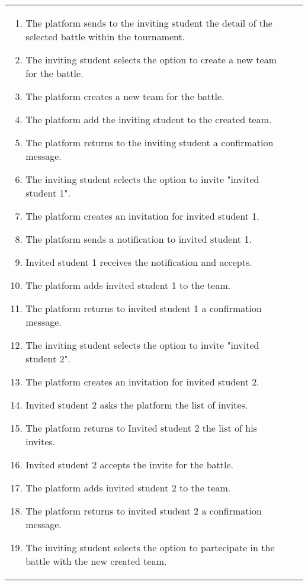 \begin{enumerate}[label=\textbf{UC\arabic*}:,ref=UC\arabic*,leftmargin=1.3cm]
{\begin{table}[H]
\begin{tabular}{|l|p{11.9cm}|}
\begin{enumerate}[label=\arabic*.]
                              \item The platform sends to the inviting student the detail of the selected battle within the tournament.
                              \item The inviting student selects the option to create a new team for the battle.
                              \item The platform creates a new team for the battle.
                              \item The platform add the inviting student to the created team.
                              \item The platform returns to the inviting student a confirmation message.
                              \item The inviting student selects the option to invite "invited student 1".
                              \item The platform creates an invitation for invited student 1.
                              \item The platform sends a notification to invited student 1.
                              \item Invited student 1 receives the notification and accepts.
                              \item The platform adds invited student 1 to the team.
                              \item The platform returns to invited student 1 a confirmation message.
                              \item The inviting student selects the option to invite "invited student 2".
                              \item The platform creates an invitation for invited student 2.
                              \item Invited student 2 asks the platform the list of invites.
                              \item The platform returns to Invited student 2 the list of his invites.
                              \item Invited student 2 accepts the invite for the battle.
                              \item The platform adds invited student 2 to the team.
                              \item The platform returns to invited student 2 a confirmation message.
                              \item The inviting student selects the option to partecipate in the battle with the new created team.

\end{enumerate}
\end{tabular}
\end{table}}
\end{enumerate}
